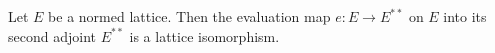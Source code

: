 Let $E$ be a normed lattice. Then the evaluation map $e \colon E \to E^{**}$ on $E$ into its second adjoint $E^{**}$ is a lattice isomorphism.
